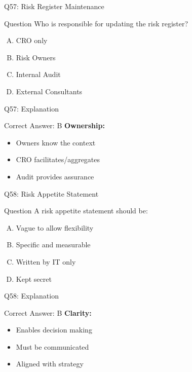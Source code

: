 \documentclass{beamer}
\begin{document}
			\begin{frame}{Q57: Risk Register Maintenance}
				\begin{block}{Question}
					Who is responsible for updating the risk register?
				\end{block}
				\begin{enumerate}[(A)]
					\item CRO only
					\item Risk Owners
					\item Internal Audit
					\item External Consultants
				\end{enumerate}
			\end{frame}
			\begin{frame}{Q57: Explanation}
				\begin{block}{Correct Answer: B}
					\textbf{Ownership:}
					\begin{itemize}
						\item Owners know the context
						\item CRO facilitates/aggregates
						\item Audit provides assurance
					\end{itemize}
				\end{block}
			\end{frame}
			
			\begin{frame}{Q58: Risk Appetite Statement}
				\begin{block}{Question}
					A risk appetite statement should be:
				\end{block}
				\begin{enumerate}[(A)]
					\item Vague to allow flexibility
					\item Specific and measurable
					\item Written by IT only
					\item Kept secret
				\end{enumerate}
			\end{frame}
			\begin{frame}{Q58: Explanation}
				\begin{block}{Correct Answer: B}
					\textbf{Clarity:}
					\begin{itemize}
						\item Enables decision making
						\item Must be communicated
						\item Aligned with strategy
					\end{itemize}
				\end{block}
			\end{frame}
			
\end{document}
